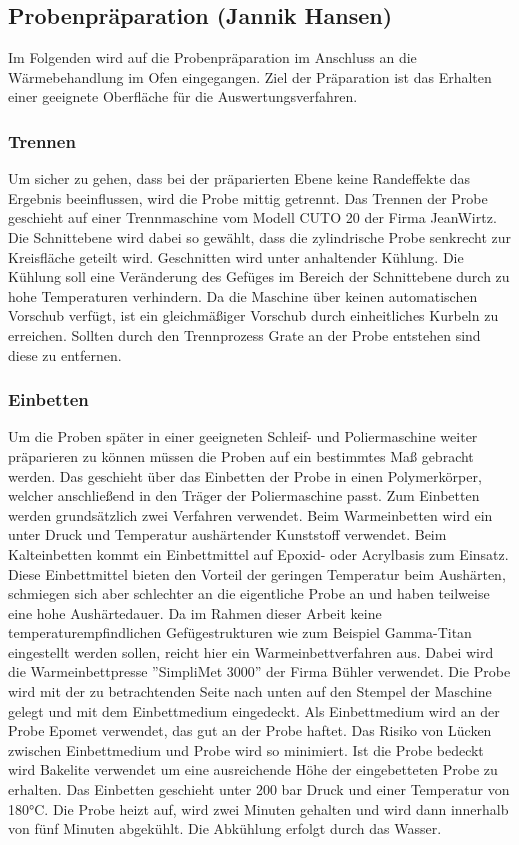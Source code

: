 \documentclass[a4paper, 11pt]{tubsreprt}
\begin{document}
\subsection{Probenpräparation (Jannik Hansen)}\label{Kapitel Probenpräperation}
Im Folgenden wird auf die Probenpräparation im Anschluss an die Wärmebehandlung im Ofen eingegangen. Ziel der Präparation ist das Erhalten einer geeignete Oberfläche für die Auswertungsverfahren. 

\subsubsection{Trennen}
Um sicher zu gehen, dass bei der präparierten Ebene keine Randeffekte das Ergebnis beeinflussen, wird die Probe mittig getrennt. Das Trennen der Probe geschieht auf einer Trennmaschine vom Modell CUTO 20 der Firma JeanWirtz. Die Schnittebene wird dabei so gewählt, dass die zylindrische Probe senkrecht zur Kreisfläche geteilt wird. Geschnitten wird unter anhaltender Kühlung. Die Kühlung soll eine Veränderung des Gefüges im Bereich der Schnittebene durch zu hohe Temperaturen verhindern. Da die Maschine über keinen automatischen Vorschub verfügt, ist ein gleichmäßiger Vorschub durch einheitliches Kurbeln zu erreichen. Sollten durch den Trennprozess Grate an der Probe entstehen sind diese zu entfernen.
\subsubsection{Einbetten}
Um die Proben später in einer geeigneten Schleif- und Poliermaschine weiter präparieren zu können müssen die Proben auf ein bestimmtes Maß gebracht werden. Das geschieht über das Einbetten der Probe in einen Polymerkörper, welcher anschließend in den Träger der Poliermaschine passt. Zum Einbetten werden grundsätzlich zwei Verfahren verwendet. Beim Warmeinbetten wird ein unter Druck und Temperatur aushärtender Kunststoff verwendet. Beim Kalteinbetten kommt ein Einbettmittel auf Epoxid- oder Acrylbasis zum Einsatz. Diese Einbettmittel bieten den Vorteil der geringen Temperatur beim Aushärten, schmiegen sich aber schlechter an die eigentliche Probe an und haben teilweise eine hohe Aushärtedauer. Da im Rahmen dieser Arbeit keine temperaturempfindlichen Gefügestrukturen wie zum Beispiel Gamma-Titan eingestellt werden sollen, reicht hier ein Warmeinbettverfahren aus. Dabei wird die  Warmeinbettpresse ''SimpliMet 3000'' der Firma Bühler verwendet. Die Probe wird mit der zu betrachtenden Seite nach unten auf den Stempel der Maschine gelegt und mit dem Einbettmedium eingedeckt. Als Einbettmedium wird an der Probe Epomet verwendet, das gut an der Probe haftet. Das Risiko von Lücken zwischen Einbettmedium und Probe wird so minimiert. Ist die Probe bedeckt wird Bakelite verwendet um eine ausreichende Höhe der eingebetteten Probe zu erhalten. Das Einbetten geschieht unter 200 bar Druck und einer Temperatur von 180°C. Die Probe heizt auf, wird zwei Minuten gehalten und wird dann innerhalb von fünf Minuten abgekühlt. Die Abkühlung erfolgt durch das Wasser. 
\end{document}
